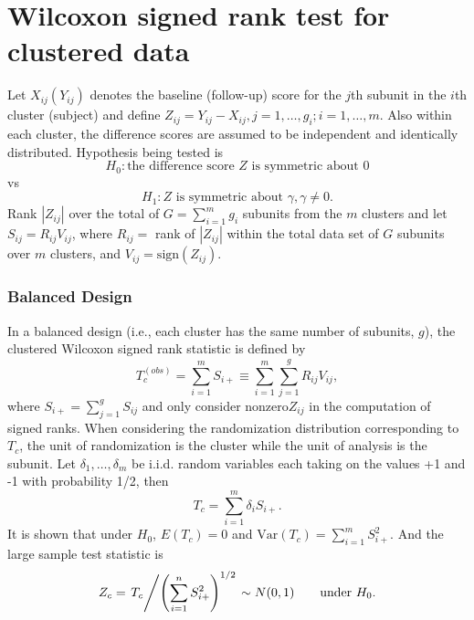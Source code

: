 \documentclass[article]{jss}
\begin{document}
\section{Wilcoxon signed rank test for clustered data}
Let $X_{ij} (Y_{ij})$ denotes the baseline (follow-up) score for the $j$th subunit in the $i$th cluster (subject) and define $Z_{ij} = Y_{ij} - X_{ij}, j = 1, \ldots,g_i; i = 1,\ldots,m$. Also within each cluster, the difference scores are assumed to be independent and identically distributed. Hypothesis being tested is
\begin{equation*}
H_0: \text{the difference score } Z \text{ is symmetric about 0}
\end{equation*}
vs
\begin{equation*}
H_1: Z \text{ is symmetric about }\gamma, \gamma \not = 0.
\end{equation*}
Rank $|Z_{ij}|$ over the total of $G = \sum_{i=1}^m g_i$ subunits from the $m$ clusters and let $S_{ij}=R_{ij}V_{ij}$, where $R_{ij} = $ rank of $|Z_{ij}|$ within the total data set of $G$ subunits over $m$ clusters, and $V_{ij} = \text{sign}(Z_{ij})$.
\subsubsection{Balanced Design} \label{bal1}
In a balanced design (i.e., each cluster has the same number of subunits, $g$), the clustered Wilcoxon signed rank statistic is defined by 
\begin{equation}
T_{c}^{(obs)} = \sum_{i=1}^mS_{i+} \equiv \sum^m_{i=1}\sum^g_{j=1}R_{ij}V_{ij},
\end{equation}
where $S_{i+} = \sum_{j=1}^gS_{ij}$ and only consider nonzero$Z_{ij}$ in the computation of signed ranks.
When considering the randomization distribution corresponding to $T_c$, the unit of randomization is the cluster while the unit of analysis is the subunit. Let $\delta_1, \ldots,\delta_m$ be i.i.d. random variables each taking on the values +1 and -1 with probability 1/2, then 
\begin{equation} \label{eq:tc}
T_c = \sum_{i=1}^m\delta_iS_{i+}.
\end{equation}
It is shown that under $H_0$, $E(T_c) = 0$ and $\text{Var}(T_c) = \sum^m_{i=1}S^2_{i+}$.
And the large sample test statistic is 
\begin{equation}
Z_c = \left. T_c \middle/ \left(\sum_{i=1}^nS^2_{i+}\right)^{1/2}\right. \sim N(0, 1)\qquad \text{under } H_0.
\end{equation}
\end{document}
